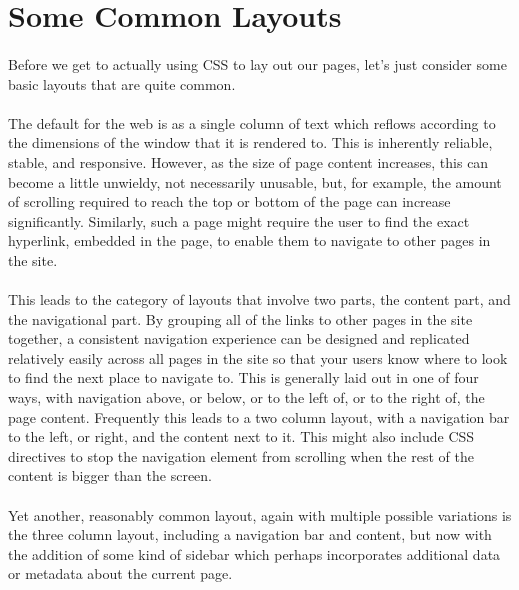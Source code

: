 \section{Some Common Layouts}
\paragraph{} Before we get to actually using CSS to lay out our pages, let's just consider some basic layouts that are quite common.
\paragraph{} The default for the web is as a single column of text which reflows according to the dimensions of the window that it is rendered to. This is inherently reliable, stable, and responsive. However, as the size of page content increases, this can become a little unwieldy, not necessarily unusable, but, for example, the amount of scrolling required to reach the top or bottom of the page can increase significantly. Similarly, such a page might require the user to find the exact hyperlink, embedded in the page, to enable them to navigate to other pages in the site.
\paragraph{} This leads to the category of layouts that involve two parts, the content part, and the navigational part. By grouping all of the links to other pages in the site together, a consistent navigation experience can be designed and replicated relatively easily across all pages in the site so that your users know where to look to find the next place to navigate to. This is generally laid out in one of four ways, with navigation above, or below, or to the left of, or to the right of, the page content. Frequently this leads to a two column layout, with a navigation bar to the left, or right, and the content next to it. This might also include CSS directives to stop the navigation element from scrolling when the rest of the content is bigger than the screen.
\paragraph{} Yet another, reasonably common layout, again with multiple possible variations is the three column layout, including a navigation bar and content, but now with the addition of some kind of sidebar which perhaps incorporates additional data or metadata about the current page.
